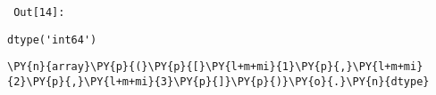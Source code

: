         {\par%
        \vspace{-1\smallerfontscale}%
        \noindent%
        \begin{minipage}{\cellleftmargin}%
    \hfill%
    {\smaller%
    \tt%
    \color{nbframe-out-prompt}%
    Out[14]:}%
    \hspace{\inputpadding}%
    \hspace{0em}%
    \hspace{3pt}%
    \end{minipage}%
        }%
    \begin{addmargin}[\cellleftmargin]{0em}%
    {\smaller%
    \vspace{-1\smallerfontscale}%
    
    
    
    \begin{verbatim}
dtype('int64')
    \end{verbatim}

    
}%
    \end{addmargin}%

{\par%
\vspace{-1\baselineskip}%
}%
\begin{notebookcell}[15]%
\begin{addmargin}[\cellleftmargin]{0em}%
{\smaller%
\par%
%
\vspace{-1\smallerfontscale}%
\begin{Verbatim}[commandchars=\\\{\}]
\PY{n}{array}\PY{p}{(}\PY{p}{[}\PY{l+m+mi}{1}\PY{p}{,}\PY{l+m+mi}{2}\PY{p}{,}\PY{l+m+mi}{3}\PY{p}{]}\PY{p}{)}\PY{o}{.}\PY{n}{dtype}
\end{Verbatim}
%
\par%
\vspace{-1\smallerfontscale}}%
\end{addmargin}
\end{notebookcell}

\par\vspace{1\smallerfontscale}%
    
